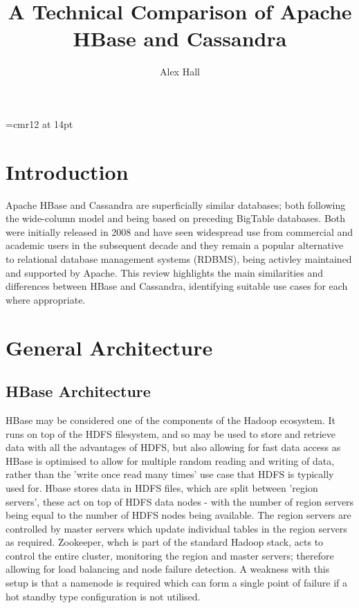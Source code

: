\documentclass[10pt]{article}
\begin{document}
%
\font\myfont=cmr12 at 14pt
\title{{\myfont A Technical Comparison of Apache HBase and Cassandra }}
\author{Alex Hall}
\maketitle
%





\section{Introduction}
Apache HBase and Cassandra are superficially similar databases; both following the wide-column model and being based on preceding BigTable databases. Both were initially released in 2008 and have seen widespread use from commercial and academic users in the subsequent decade and they remain a popular alternative to relational database management systems (RDBMS), being activley maintained and supported by Apache. This review highlights the main similarities and differences between HBase and Cassandra, identifying suitable use cases for each where appropriate.

\section{General Architecture}
\subsection {HBase Architecture}
HBase may be considered one of the components of the Hadoop ecosystem. It runs on top of the HDFS filesystem, and so may be used to store and retrieve data with all the advantages of HDFS, but also allowing for fast data access as HBase is optimised to allow for multiple random reading and writing of data, rather than the 'write once read many times' use case that HDFS is typically used for.  Hbase stores data in HDFS files, which are split between 'region servers', these act on top of HDFS data nodes - with the number of region servers being equal to the number of HDFS nodes being available. The region servers are controlled by master servers which update individual tables in the region servers as required. Zookeeper, whch is part of the standard Hadoop stack, acts to control the entire cluster, monitoring the region and master servers; therefore allowing for load balancing and node failure detection. A weakness with this setup is that a namenode is required which can form a single point of failure if a hot standby type configuration is not utilised.\\
\end{document}
